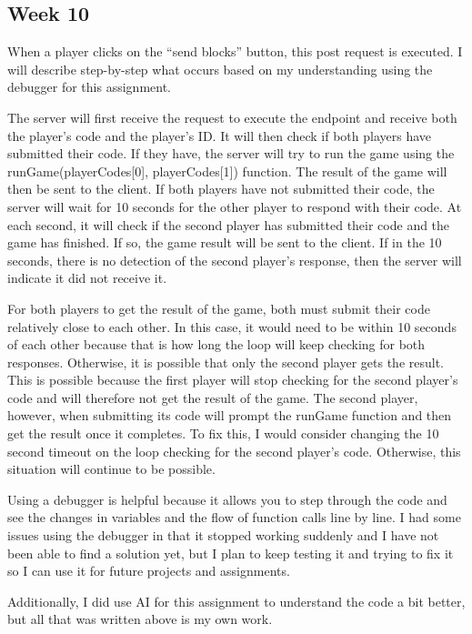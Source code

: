 \documentclass{article}
\theoremstyle{theorem}
\theoremstyle{definition}
\theoremstyle{remark}
\begin{document}
\subsection{Week 10}
When a player clicks on the “send blocks” button, this post request is executed. I will describe step-by-step what occurs based on my understanding using the debugger for this assignment. 

The server will first receive the request to execute the endpoint and receive both the player’s code and the player’s ID. It will then check if both players have submitted their code. If they have, the server will try to run the game using the runGame(playerCodes[0], playerCodes[1]) function. 
The result of the game will then be sent to the client. If both players have not submitted their code, the server will wait for 10 seconds for the other player to respond with their code. At each second, it will check if the second player has submitted their code and the game has finished. If 
so, the game result will be sent to the client. If in the 10 seconds, there is no detection of the second player’s response, then the server will indicate it did not receive it. 

For both players to get the result of the game, both must submit their code relatively close to each other. In this case, it would need to be within 10 seconds of each other because that is how long the loop will keep checking for both responses. Otherwise, it is possible that only the second 
player gets the result. This is possible because the first player will stop checking for the second player’s code and will therefore not get the result of the game. The second player, however, when submitting its code will prompt the runGame function and then get the result once it completes. 
To fix this, I would consider changing the 10 second timeout on the loop checking for the second player’s code. Otherwise, this situation will continue to be possible. 

Using a debugger is helpful because it allows you to step through the code and see the changes in variables and the flow of function calls line by line. I had some issues using the debugger in that it stopped working suddenly and I have not been able to find a solution yet, but I plan to keep
 testing it and trying to fix it so I can use it for future projects and assignments. 

Additionally, I did use AI for this assignment to understand the code a bit better, but all that was written above is my own work. 
\end{document}
